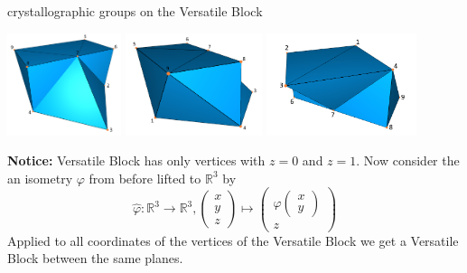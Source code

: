 \documentclass{beamer}
\numberwithin{equation}{aufgabe}
\newcommand\R{\mathbb R}
\renewcommand{\phi}{\varphi}
\begin{document}
\begin{frame}{crystallographic groups on the Versatile Block}
    \begin{center}    
        \includegraphics[width=0.25\textwidth]{images/versatile-front.png}
        \includegraphics[width=0.3\textwidth]{images/versatile-back.png}
        \includegraphics[width=0.33\textwidth]{images/versatile-square.png}
    \end{center}
    \pause
    \textbf{Notice:} Versatile Block has only vertices with $z=0$ and $z=1$.
    Now consider the an isometry $\phi$ from before lifted to $\R^3$ by
    $$
    \hat \phi : \R^3 \to \R^3, \begin{pmatrix}x \\ y \\ z \end{pmatrix} \mapsto  \begin{pmatrix} \phi \begin{pmatrix}x \\ y \end{pmatrix} \\ z \end{pmatrix}
    $$ \pause
    Applied to all coordinates of the vertices of the Versatile Block we get a Versatile Block between the same planes.
\end{frame}
\end{document}
